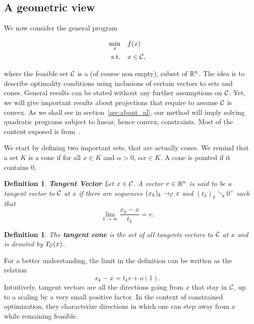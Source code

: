 \documentclass[10pt]{article}
\newtheorem{definition}[theorem]{Definition}
\numberwithin{equation}{section}
\begin{document}
	\subsection{A geometric view}
	
	We now consider the general program
	
	\begin{equation}
		\label{eq:math_prog_geom}
		\begin{aligned}
			\min_x \quad & f(x) \\
			\text{s.t.} \quad & x \in {\mathcal{C}},
		\end{aligned}
	\end{equation}
	
	where the feasible set ${\mathcal{C}}$ is a (of course non empty), subset of ${\mathbb{R}}^n$. The idea is to describe optimality conditions using inclusions of certain vectors to sets and cones. General results can be stated without any further assumptions on ${\mathcal{C}}$. Yet, we will give important results about projections that require to assume ${\mathcal{C}}$ is convex. As we shall see in section~\ref{sec:about_al}, our method will imply solving quadratic programs subject to linear, hence convex, constraints. Most of the content exposed is from~\cite[][Chapter 12]{nocedalwright:2006}.
	
	We start by defining two important sets, that are actually cones. We remind that a set $K$ is a cone if for all $x \in K$ and $\alpha >0 $, $\alpha x\in K $. A cone is pointed if it contains $0$.
	
	\begin{definition}\textbf{Tangent Vector}
		Let $x\in {\mathcal{C}}$. A vector $v\in {\mathbb{R}}^n$ is said to be a tangent vector to ${\mathcal{C}}$  at $x$ if there are sequences $(x_k)_k \to_{\mathcal{C}} x$ and $(t_k)_k \searrow 0^+$ such that 
		\[\lim\limits_{k\to \infty} \dfrac{x_k-x}{t_k}=v.\]
	\end{definition}
	
	\begin{definition}
		
	The \textbf{tangent cone} is the set of all tangents vectors to ${\mathcal{C}}$ at $x$ and is denoted by $T_{\mathcal{C}}(x)$.
	\end{definition}
	
	For a better understanding, the limit in the definition can be written as the relation
	\[x_k - x = t_kv + o(1).\]
	Intuitively, tangent vectors are all the directions going from $x$ that stay in ${\mathcal{C}}$, up to a scaling by a very small positive factor. In the context of constrained optimization, they characterize directions in which one can step away from $x$ while remaining feasible. 
	
\end{document}
